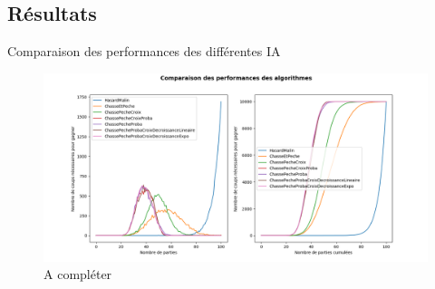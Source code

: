 \subsection{Résultats}
	
	\begin{frame}{Comparaison des performances des différentes IA}
		\begin{figure}
	        \centering
	        \includegraphics[width=.95\linewidth]{images/perfsstats.png} %
	        \caption*{A compléter}
	        \label{fig:perfssl}
	    \end{figure}{}
	\end{frame}